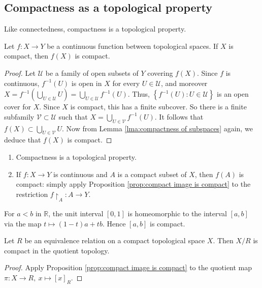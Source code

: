 \documentclass[a4paper,11pt]{article}
\begin{document}
\subsection{Compactness as a topological property}
Like connectedness, compactness is a topological property.
\begin{proposition}\label{prop:compact image is compact}
    Let $f: X \rightarrow Y$ be a continuous function between topological spaces. If $X$ is compact, then $f(X)$ is compact.
\end{proposition}
\begin{proof}
    Let $\mathcal{U}$ be a family of open subsets of $Y$ covering $f(X)$. Since $f$ is continuous, $f^{-1}(U)$ is open in $X$ for every $U \in \mathcal{U}$, and moreover
$X=f^{-1}\left(\bigcup_{U \in \mathcal{U}} U\right)=\bigcup_{U \in \mathcal{U}} f^{-1}(U)$. Thus, $\left\{f^{-1}(U): U \in \mathcal{U}\right\}$ is an open cover for $X$. Since $X$ is compact, this has a finite subcover. So there is a finite subfamily $\mathcal{V} \subset \mathcal{U}$ such that $X=\bigcup_{U \in \mathcal{V}} f^{-1}(U)$. It follows that $f(X) \subset \bigcup_{U \in \mathcal{V}} U$. Now from Lemma \ref{lma:compactness of subspaces} again, we deduce that $f(X)$ is compact.
\end{proof}
\begin{remark}
    \begin{enumerate}
        \item Compactness is a topological property.
      
        \item If $f: X \rightarrow Y$ is continuous and $A$ is a compact subset of $X$, then $f(A)$ is compact: simply apply Proposition \ref{prop:compact image is compact} to the restriction $f\restriction_{A}: A \rightarrow Y$.
      \end{enumerate}
\end{remark}

\begin{example}
    For $a<b$ in $\mathbb{R}$, the unit interval $[0,1]$ is homeomorphic to the interval $[a, b]$ via the map $t \mapsto(1-t) a+t b$. Hence $[a, b]$ is compact.
\end{example}

\begin{corollary}\label{col:compact quotient is compact}
    Let $R$ be an equivalence relation on a compact topological space $X$. Then $X / R$ is compact in the quotient topology.
\end{corollary}
\begin{proof}
    Apply Proposition \ref{prop:compact image is compact} to the quotient map $ \pi: X \to R,\ x \mapsto [x]_R $.
\end{proof}
\end{document}
